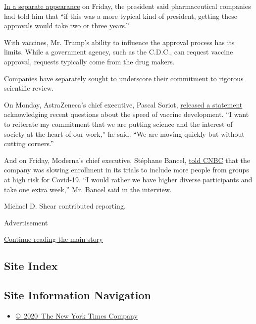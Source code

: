 \href{https://slack-redir.net/link?url=https\%3A\%2F\%2Ftwitter.com\%2Fthehill\%2Fstatus\%2F1301926138818768896}{In
a separate appearance} on Friday, the president said pharmaceutical
companies had told him that ``if this was a more typical kind of
president, getting these approvals would take two or three years.''

With vaccines, Mr. Trump's ability to influence the approval process has
its limits. While a government agency, such as the C.D.C., can request
vaccine approval, requests typically come from the drug makers.

Companies have separately sought to underscore their commitment to
rigorous scientific review.

On Monday, AstraZeneca's chief executive, Pascal Soriot,
\href{https://www.astrazeneca.com/content/astraz/media-centre/press-releases/2020/astrazenecas-scientific-and-social-commitment-for-covid-19-vaccine.html}{released
a statement} acknowledging recent questions about the speed of vaccine
development. ``I want to reiterate my commitment that we are putting
science and the interest of society at the heart of our work,'' he said.
``We are moving quickly but without cutting corners.''

And on Friday, Moderna's chief executive, Stéphane Bancel,
\href{https://www.cnbc.com/2020/09/04/moderna-slows-coronavirus-vaccine-trial-t-to-ensure-minority-representation-ceo-says.html}{told
CNBC} that the company was slowing enrollment in its trials to include
more people from groups at high risk for Covid-19. ``I would rather we
have higher diverse participants and take one extra week,'' Mr. Bancel
said in the interview.

Michael D. Shear contributed reporting.

Advertisement

\protect\hyperlink{after-bottom}{Continue reading the main story}

\hypertarget{site-index}{%
\subsection{Site Index}\label{site-index}}

\hypertarget{site-information-navigation}{%
\subsection{Site Information
Navigation}\label{site-information-navigation}}

\begin{itemize}
\tightlist
\item
  \href{https://help.nytimes3xbfgragh.onion/hc/en-us/articles/115014792127-Copyright-notice}{©~2020~The
  New York Times Company}
\end{itemize}

